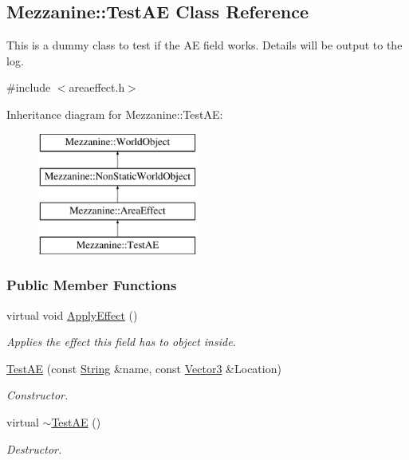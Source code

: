\hypertarget{classMezzanine_1_1TestAE}{
\subsection{Mezzanine::TestAE Class Reference}
\label{classMezzanine_1_1TestAE}
}


This is a dummy class to test if the AE field works. Details will be output to the log.  




{\ttfamily \#include $<$areaeffect.h$>$}

Inheritance diagram for Mezzanine::TestAE:\begin{figure}[H]
\begin{center}
\leavevmode
\includegraphics[height=4.000000cm]{classMezzanine_1_1TestAE}
\end{center}
\end{figure}
\subsubsection*{Public Member Functions}
\begin{DoxyCompactItemize}
\item 
virtual void \hyperlink{classMezzanine_1_1TestAE_a647737a517fb6c87489afc93b9daa91c}{ApplyEffect} ()
\begin{DoxyCompactList}\small\item\em Applies the effect this field has to object inside. \item\end{DoxyCompactList}\item 
\hyperlink{classMezzanine_1_1TestAE_a19ed2bafef2c0d835bbf01efdda3e241}{TestAE} (const \hyperlink{namespaceMezzanine_acf9fcc130e6ebf08e3d8491aebcf1c86}{String} \&name, const \hyperlink{classMezzanine_1_1Vector3}{Vector3} \&Location)
\begin{DoxyCompactList}\small\item\em Constructor. \item\end{DoxyCompactList}\item 
virtual \hyperlink{classMezzanine_1_1TestAE_adb985f43d40500de7f18041a4f7807d7}{$\sim$TestAE} ()
\begin{DoxyCompactList}\small\item\em Destructor. \item\end{DoxyCompactList}\end{DoxyCompactItemize}


